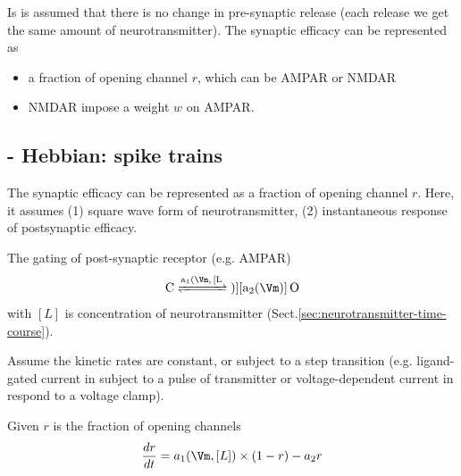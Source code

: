 Is is assumed that there is no change in pre-synaptic release (each release we
get the same amount of neurotransmitter). The synaptic efficacy can be
represented as
\begin{itemize}
  \item  a fraction of opening channel $r$, which can be AMPAR or NMDAR
  
  \item NMDAR impose a weight $w$ on AMPAR.
\end{itemize}


\subsection{- Hebbian: spike trains}
\label{sec:synaptic-efficacy-pre-synaptic-factors-Hebbian-square-wave-instant-response} 

The synaptic efficacy can be represented as a fraction of opening channel $r$.
Here, it assumes (1) square wave form of neurotransmitter, (2) instantaneous
response of postsynaptic efficacy.

The gating of post-synaptic receptor (e.g. AMPAR)
\begin{equation}
\ce{C <=>[a_1(\Vm,[L])][a_2(\Vm)] O}
\end{equation}
with $[L]$ is concentration of neurotransmitter
(Sect.\ref{sec:neurotransmitter-time-course}). 

Assume the kinetic rates are constant, or subject to a step transition
(e.g. ligand-gated current in subject to a pulse of transmitter or
voltage-dependent current in respond to a voltage clamp).

Given $r$ is the fraction of opening channels
\begin{equation}
\frac{dr}{dt} = a_1 (\Vm,[L]) \times (1-r) - a_2 r
\end{equation}

